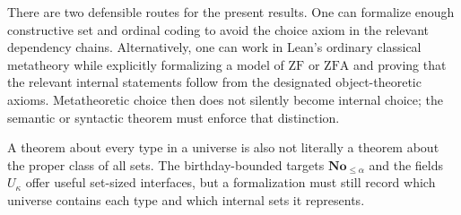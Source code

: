 \documentclass[11pt,letterpaper]{article}
\theoremstyle{definition}
\theoremstyle{remark}
\newcommand{\No}{\mathbf{No}}
\newcommand{\ZF}{\mathrm{ZF}}
\newcommand{\ZFA}{\mathrm{ZFA}}
\begin{document}
There are two defensible routes for the present results. One can formalize enough constructive set and ordinal coding to avoid the choice axiom in the relevant dependency chains. Alternatively, one can work in Lean's ordinary classical metatheory while explicitly formalizing a model of $\ZF$ or $\ZFA$ and proving that the relevant internal statements follow from the designated object-theoretic axioms. Metatheoretic choice then does not silently become internal choice; the semantic or syntactic theorem must enforce that distinction.

A theorem about every type in a universe is also not literally a theorem about the proper class of all sets. The birthday-bounded targets $\No_{\le\alpha}$ and the fields $U_\kappa$ offer useful set-sized interfaces, but a formalization must still record which universe contains each type and which internal sets it represents.

\end{document}
